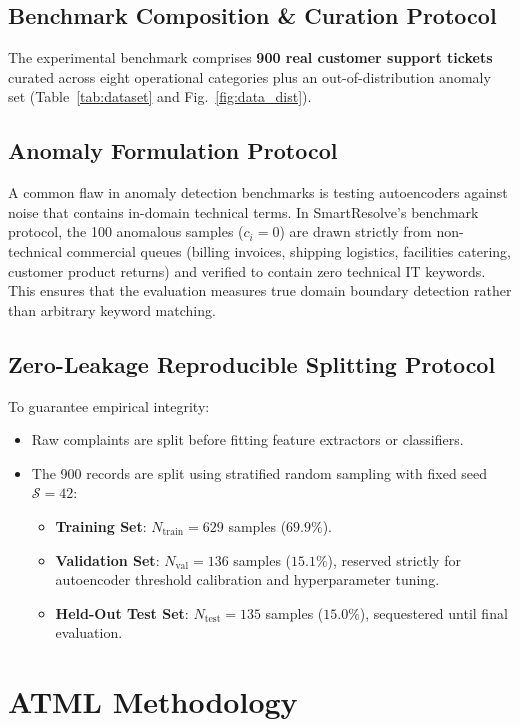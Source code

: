 \documentclass[conference]{IEEEtran}
\begin{document}
\subsection{Benchmark Composition \& Curation Protocol}
The experimental benchmark comprises \textbf{900 real customer support tickets} curated across eight operational categories plus an out-of-distribution anomaly set (Table~\ref{tab:dataset} and Fig.~\ref{fig:data_dist}).

\subsection{Anomaly Formulation Protocol}
A common flaw in anomaly detection benchmarks is testing autoencoders against noise that contains in-domain technical terms. In SmartResolve's benchmark protocol, the 100 anomalous samples ($c_i = 0$) are drawn strictly from non-technical commercial queues (billing invoices, shipping logistics, facilities catering, customer product returns) and verified to contain zero technical IT keywords. This ensures that the evaluation measures true domain boundary detection rather than arbitrary keyword matching.

\subsection{Zero-Leakage Reproducible Splitting Protocol}
To guarantee empirical integrity:
\begin{itemize}
    \item Raw complaints are split before fitting feature extractors or classifiers.
    \item The 900 records are split using stratified random sampling with fixed seed $\mathcal{S}=42$:
    \begin{itemize}
        \item \textbf{Training Set}: $N_{\text{train}} = 629$ samples ($69.9\%$).
        \item \textbf{Validation Set}: $N_{\text{val}} = 136$ samples ($15.1\%$), reserved strictly for autoencoder threshold calibration and hyperparameter tuning.
        \item \textbf{Held-Out Test Set}: $N_{\text{test}} = 135$ samples ($15.0\%$), sequestered until final evaluation.
    \end{itemize}
\end{itemize}

\section{ATML Methodology}
\end{document}
